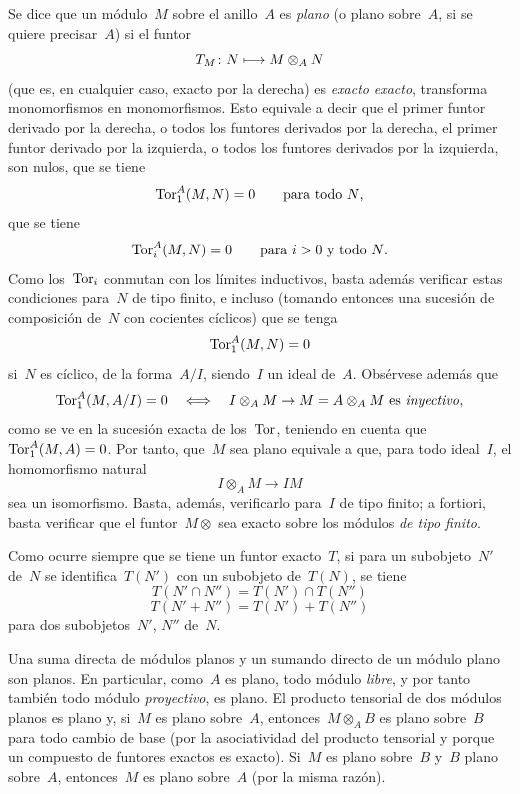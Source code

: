 Se dice que un módulo~$M$ sobre el anillo~$A$ es \emph{plano}
%
(o plano sobre~$A$, si se quiere precisar~$A$)
si el funtor
$$
T_M \colon N \longmapsto M \otimes_{A}N
$$
(que es, en cualquier caso, exacto por la derecha) es
{\emph{exacto}}
{\emph{exacto},}
\ie transforma monomorfismos en monomorfismos. Esto equivale a decir que
{el primer funtor derivado por la derecha, o todos los funtores derivados por la derecha,}
{el primer funtor derivado por la izquierda, o todos los funtores derivados por la izquierda,}
son nulos, \ie que se tiene%
{}
{\enlargethispage{.5cm}}
$$
\operatorname{Tor}^{A}_{1}(M,N)=0 \qquad \text{para todo $N$,}
$$
\resp que se tiene
$$
\operatorname{Tor}^{A}_{i}(M,N)=0 \qquad \text{para $i>0$ y todo $N$.}
$$
Como los~$\operatorname{Tor}_i$ conmutan con los límites inductivos, basta además verificar estas condiciones para~$N$ de tipo finito, e incluso (tomando entonces una sucesión de composición de~$N$ con cocientes cíclicos) que se tenga
$$
\operatorname{Tor}^{A}_{1}(M,N)=0
$$
si~$N$ es cíclico, \ie de la forma~$A/I$, siendo~$I$ un ideal de~$A$. Obsérvese además que
$$
\operatorname{Tor}^{A}_{1}(M,A/I)=0 \quad\Longleftrightarrow\quad I\otimes_{A}M \rightarrow
M=A\otimes_{A}M\text{ es \emph{inyectivo}},
$$
como se ve en la sucesión exacta de los~$\operatorname{Tor}$, teniendo en cuenta que~$\operatorname{Tor}^{A}_{1}(M,A)=0$. Por tanto, que~$M$ sea plano equivale a que, para todo ideal~$I$, el homomorfismo natural
$$
I\otimes_{A}M \to IM
$$
sea un isomorfismo. Basta, además, verificarlo para~$I$ de tipo finito; a fortiori, basta verificar que el funtor~$M\otimes$ sea exacto sobre los módulos \emph{de tipo finito}.

Como ocurre siempre que se tiene un funtor exacto~$T$, si para un subobjeto~$N'$ de~$N$ se identifica~$T(N')$ con un subobjeto de~$T(N)$, se tiene
$$
T(N' \cap N'')=T(N') \cap T(N'')
$$
$$
T(N' + N'')=T(N') + T(N'')
$$
para dos subobjetos~$N'$, $N''$ de~$N$.

Una suma directa de módulos planos y un sumando directo de un módulo plano son planos. En particular, como~$A$ es plano, todo módulo \emph{libre}, y por tanto también todo módulo \emph{proyectivo}, es plano. El producto tensorial de dos módulos planos es plano y, si~$M$ es plano sobre~$A$, entonces~$M\otimes_AB$ es plano sobre~$B$ para todo cambio de base
(por la asociatividad del producto tensorial y porque un compuesto de funtores
exactos es exacto). Si~$M$ es plano sobre~$B$ y~$B$ plano sobre~$A$, entonces~$M$ es plano sobre~$A$ (por la misma razón).

